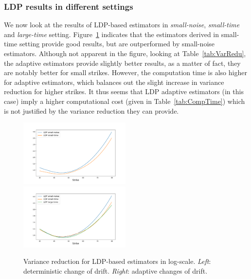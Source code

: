 \subsubsection{LDP results in different settings}
We now look at the results of LDP-based estimators in \textit{small-noise}, \textit{small-time} and \textit{large-time} setting. Figure~\ref{fig:LDPvarianceRedu} indicates that the estimators derived
in small-time setting provide good results, but are outperformed by small-noise estimators. Although not apparent in the figure, looking at Table~\ref{tab:VarRedu}, the adaptive estimators provide slightly better results, as a matter of fact, they are notably better for small strikes. However, the computation time is also higher for adaptive estimators, which balances out the slight increase in variance reduction for higher strikes.
It thus seems that LDP adaptive estimators (in this case) imply a higher computational cost (given in Table~\ref{tab:CompTime}) which is not justified
by the variance reduction they can provide.
\begin{figure}[H]
    \centering
    \includegraphics[width=0.495\textwidth, trim={2cm 0.5cm 2cm 1cm }]{content/reschap3/Figures/HESTON/compare-ldp-new.pdf}
    \includegraphics[width=0.495\textwidth, trim={2cm 0.5cm 2cm 1cm }]{content/reschap3/Figures/HESTON/compare-ldpada1-new.pdf}
    \caption{Variance reduction for LDP-based estimators in log-scale. \textit{Left}: deterministic change of drift. \textit{Right}: adaptive changes of drift.}\label{fig:LDPvarianceRedu}
\end{figure}

